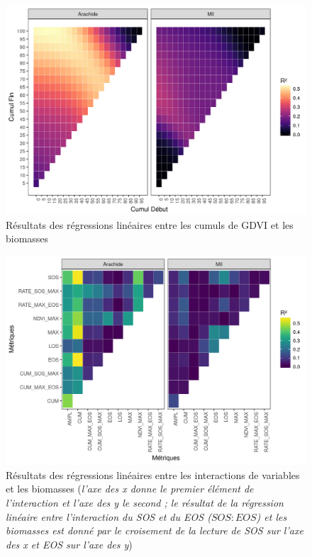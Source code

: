 \begin{figure}[htbp]
 \begin{center}
  \includegraphics[scale=0.7]{resultats_discussions/Cum_Biom_GDVI.png} 
 \end{center}
 \caption[Régressions linéaires entre cumuls de GDVI et biomasses]{Résultats des régressions linéaires entre les cumuls de GDVI et les biomasses}
 \label{fig-cum-biom-gdvi}
\end{figure}

\begin{figure}[htbp]
 \begin{center}
  \includegraphics[scale=0.7]{resultats_discussions/Inter_Biom.png} 
 \end{center}
 \caption[Régressions linéaires entre interactions et biomasses]{Résultats des régressions linéaires entre les interactions de variables et les biomasses (\emph{l’axe des x donne le premier élément de l’interaction et l’axe des y le second ; le résultat de la régression linéaire entre l’interaction du SOS et du EOS ($SOS : EOS$) et les biomasses est donné par le croisement de la lecture de SOS sur l’axe des x et EOS sur l’axe des y})}
 \label{fig-inter-biom}
\end{figure}

